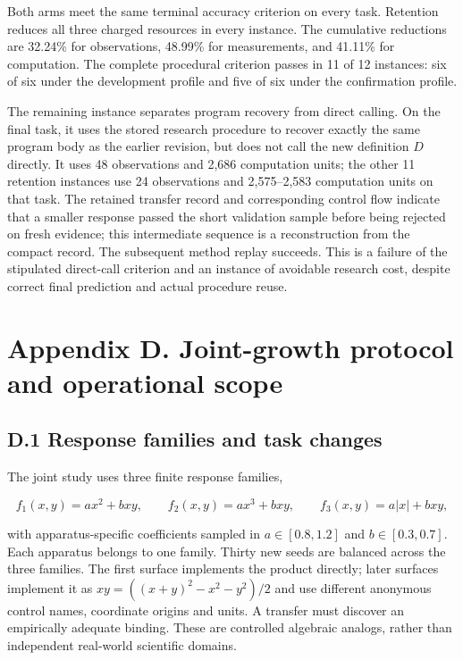 \documentclass[twoside,11pt]{article}
\begin{document}
Both arms meet the same terminal accuracy criterion on every task. Retention reduces all three charged resources in every instance. The cumulative reductions are 32.24\% for observations, 48.99\% for measurements, and 41.11\% for computation. The complete procedural criterion passes in 11 of 12 instances: six of six under the development profile and five of six under the confirmation profile.


The remaining instance separates program recovery from direct calling. On the final task, it uses the stored research procedure to recover exactly the same program body as the earlier revision, but does not call the new definition \(D\) directly. It uses 48 observations and 2,686 computation units; the other 11 retention instances use 24 observations and 2,575–2,583 computation units on that task. The retained transfer record and corresponding control flow indicate that a smaller response passed the short validation sample before being rejected on fresh evidence; this intermediate sequence is a reconstruction from the compact record. The subsequent method replay succeeds. This is a failure of the stipulated direct-call criterion and an instance of avoidable research cost, despite correct final prediction and actual procedure reuse.


\section*{Appendix D. Joint-growth protocol and operational scope}

\subsection*{D.1 Response families and task changes}

The joint study uses three finite response families,


\[
f_1(x,y)=a x^2+bxy,\qquad
f_2(x,y)=a x^3+bxy,\qquad
f_3(x,y)=a|x|+bxy,
\]


with apparatus-specific coefficients sampled in \(a\in[0.8,1.2]\) and
\(b\in[0.3,0.7]\). Each apparatus belongs to one family. Thirty new seeds are
balanced across the three families. The first surface implements the product
directly; later surfaces implement it as
\(xy=((x+y)^2-x^2-y^2)/2\) and use different anonymous control names, coordinate
origins and units. A transfer must discover an empirically adequate binding.
These are controlled algebraic analogs, rather than independent real-world
scientific domains.
\end{document}
